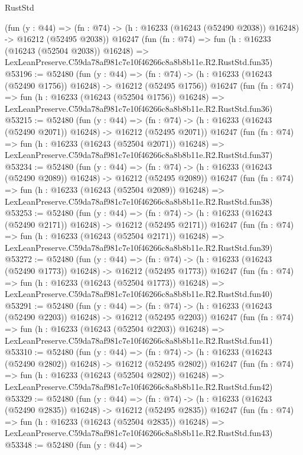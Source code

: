 \begin{lexlean}{RustStd}
\begin{coremodule}
    (fun (y : @44) =>
    (fn : @74) -> (h : @16233 (@16243 (@52490 @2038)) @16248) -> @16212 (@52495 @2038))
    @16247
    (fun (fn : @74) =>
    fun (h : @16233 (@16243 (@52504 @2038)) @16248) =>
    LexLeanPreserve.C59da78af981c7e10f46266c8a8b8b11e.R2.RustStd.fun35)
@53196 := @52480
    (fun (y : @44) =>
    (fn : @74) -> (h : @16233 (@16243 (@52490 @1756)) @16248) -> @16212 (@52495 @1756))
    @16247
    (fun (fn : @74) =>
    fun (h : @16233 (@16243 (@52504 @1756)) @16248) =>
    LexLeanPreserve.C59da78af981c7e10f46266c8a8b8b11e.R2.RustStd.fun36)
@53215 := @52480
    (fun (y : @44) =>
    (fn : @74) -> (h : @16233 (@16243 (@52490 @2071)) @16248) -> @16212 (@52495 @2071))
    @16247
    (fun (fn : @74) =>
    fun (h : @16233 (@16243 (@52504 @2071)) @16248) =>
    LexLeanPreserve.C59da78af981c7e10f46266c8a8b8b11e.R2.RustStd.fun37)
@53234 := @52480
    (fun (y : @44) =>
    (fn : @74) -> (h : @16233 (@16243 (@52490 @2089)) @16248) -> @16212 (@52495 @2089))
    @16247
    (fun (fn : @74) =>
    fun (h : @16233 (@16243 (@52504 @2089)) @16248) =>
    LexLeanPreserve.C59da78af981c7e10f46266c8a8b8b11e.R2.RustStd.fun38)
@53253 := @52480
    (fun (y : @44) =>
    (fn : @74) -> (h : @16233 (@16243 (@52490 @2171)) @16248) -> @16212 (@52495 @2171))
    @16247
    (fun (fn : @74) =>
    fun (h : @16233 (@16243 (@52504 @2171)) @16248) =>
    LexLeanPreserve.C59da78af981c7e10f46266c8a8b8b11e.R2.RustStd.fun39)
@53272 := @52480
    (fun (y : @44) =>
    (fn : @74) -> (h : @16233 (@16243 (@52490 @1773)) @16248) -> @16212 (@52495 @1773))
    @16247
    (fun (fn : @74) =>
    fun (h : @16233 (@16243 (@52504 @1773)) @16248) =>
    LexLeanPreserve.C59da78af981c7e10f46266c8a8b8b11e.R2.RustStd.fun40)
@53291 := @52480
    (fun (y : @44) =>
    (fn : @74) -> (h : @16233 (@16243 (@52490 @2203)) @16248) -> @16212 (@52495 @2203))
    @16247
    (fun (fn : @74) =>
    fun (h : @16233 (@16243 (@52504 @2203)) @16248) =>
    LexLeanPreserve.C59da78af981c7e10f46266c8a8b8b11e.R2.RustStd.fun41)
@53310 := @52480
    (fun (y : @44) =>
    (fn : @74) -> (h : @16233 (@16243 (@52490 @2802)) @16248) -> @16212 (@52495 @2802))
    @16247
    (fun (fn : @74) =>
    fun (h : @16233 (@16243 (@52504 @2802)) @16248) =>
    LexLeanPreserve.C59da78af981c7e10f46266c8a8b8b11e.R2.RustStd.fun42)
@53329 := @52480
    (fun (y : @44) =>
    (fn : @74) -> (h : @16233 (@16243 (@52490 @2835)) @16248) -> @16212 (@52495 @2835))
    @16247
    (fun (fn : @74) =>
    fun (h : @16233 (@16243 (@52504 @2835)) @16248) =>
    LexLeanPreserve.C59da78af981c7e10f46266c8a8b8b11e.R2.RustStd.fun43)
@53348 := @52480
    (fun (y : @44) =>

\end{coremodule}
\end{lexlean}
